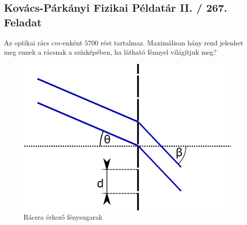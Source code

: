 \documentclass[11pt,a4paper,openany,leqno]{article}
\begin{document}
\subsection{Kovács-Párkányi Fizikai Példatár II. / 267. Feladat}
\indent
Az optikai rács $cm$-enként $5700$ rést tartalmaz. Maximálisan hány rend jelenhet meg ennek a rácsnak a színképében, ha látható fénnyel világítjuk meg?
\begin{figure}[h!]
\centering
  \includegraphics[width=120mm,scale=0.5]{kep31.pdf}
  \caption{Rácsra érkező fénysugarak}
  \label{}
\end{figure} 
 \indent
\end{document}
